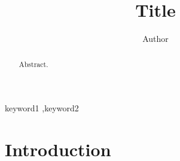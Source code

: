 \documentclass[final,5p,times,twocolumn]{elsarticle}
\begin{document}
\begin{frontmatter}

\title{Title}

\author{Author}

\begin{abstract}
Abstract.
\end{abstract}

\begin{keyword}
keyword1 \sep keyword2
\end{keyword}

\end{frontmatter}

\section{Introduction}


\end{document}

